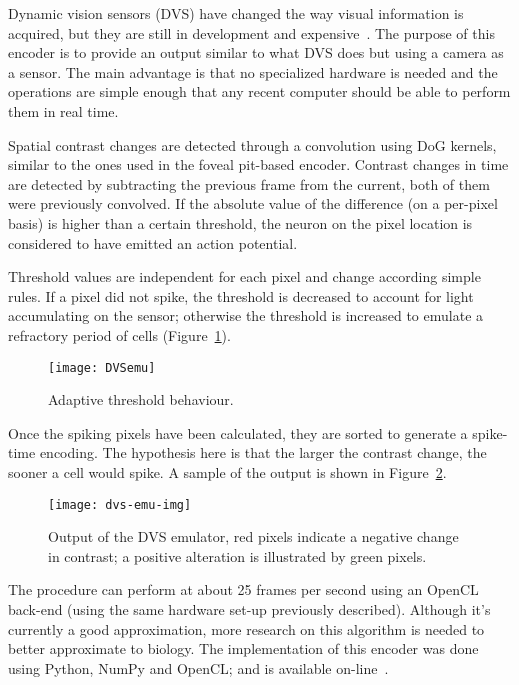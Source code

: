 Dynamic vision sensors (DVS) have changed the way visual information is acquired, but they are still in development and expensive~\cite{aer-retina-bernabe,dvs-zurich}. The purpose of this encoder is to provide an output similar to what DVS does but using a camera as a sensor.
The main advantage is that no specialized hardware is needed and the operations are simple enough that any recent computer should be able to perform them in real time. 

Spatial contrast changes are detected through a convolution using DoG kernels, similar to the ones used in the foveal pit-based encoder. Contrast changes in time are detected by subtracting the previous frame from the current, both of them were previously convolved. If the absolute value of the difference (on a per-pixel basis) is higher than a certain threshold, the neuron on the pixel location is considered to have emitted an action potential. 

Threshold values are independent for each pixel and change according simple rules. If a pixel did not spike, the threshold is decreased to account for light accumulating on the sensor; otherwise the threshold is increased to emulate a refractory period of cells (Figure~\ref{fig:c2s:threshold_behaviour}).

\begin{figure}[h]
  \begin{center}
    \texttt{[image: DVSemu]}
    \caption{Adaptive threshold behaviour.}
    \label{fig:c2s:threshold_behaviour}
  \end{center}
\end{figure}
\newpage
Once the spiking pixels have been calculated, they are sorted to generate a spike-time encoding. The hypothesis here is that the larger the contrast change, the sooner a cell would spike. A sample of the output is shown in Figure~\ref{fig:c2s:dvs-emu-output}.

\begin{figure}[h]
  \begin{center}
    \texttt{[image: dvs-emu-img]}
    \caption{Output of the DVS emulator, red pixels indicate a negative change in contrast; a positive alteration is illustrated by green pixels.}
    \label{fig:c2s:dvs-emu-output}
  \end{center}
\end{figure}

The procedure can perform at about 25 frames per second using an OpenCL back-end (using the same hardware set-up previously described). Although 
it's currently a good approximation, more research on this algorithm is needed 
to better approximate to biology. The implementation of this encoder was done using Python, NumPy and OpenCL; and is available on-line~\cite{pydvs-code}.

